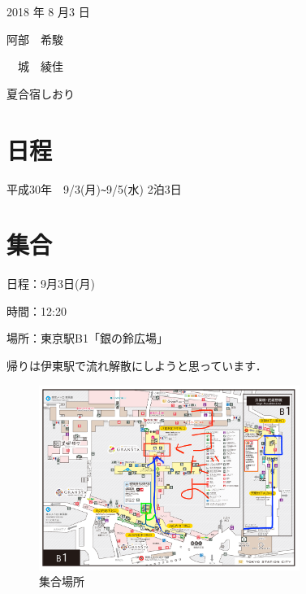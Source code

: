 \documentclass[a4j,11pt]{jsarticle}
\begin{document}
\begin{flushright} %
2018 年 8 月3 日

阿部　希駿

　城　綾佳
\end{flushright}
\begin{center} %
\Large{夏合宿しおり}
\end{center}

\section{日程} %
\label{sec:start} %
平成30年　9/3(月)\verb|~|9/5(水)     2泊3日

 
\section{集合} %
\label{sec:end} %
日程：9月3日(月)

時間：12:20

場所：東京駅B1「銀の鈴広場」

帰りは伊東駅で流れ解散にしようと思っています．

\begin{figure}[H]
\begin{center}
\includegraphics[width=85mm]{syuugo1.pdf}
\end{center}
\caption{集合場所}
\label{fig:2}
\end{figure}
\end{document}
